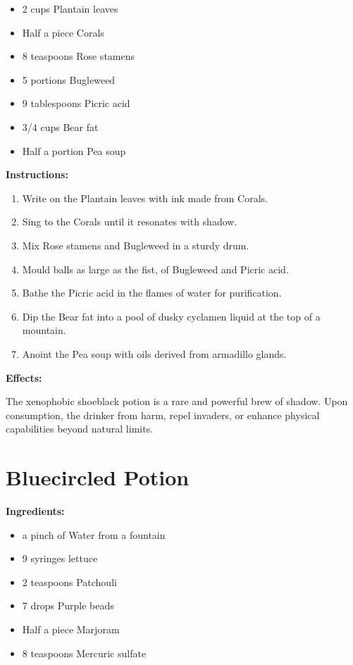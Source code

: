 \documentclass{article}
\begin{document}
\begin{itemize}
  \item 2 cups Plantain leaves
  \item Half a piece Corals
  \item 8 teaspoons Rose stamens
  \item 5 portions Bugleweed
  \item 9 tablespoons Picric acid
  \item 3/4 cups Bear fat
  \item Half a portion Pea soup
\end{itemize}

\textbf{Instructions:}

\begin{enumerate}
  \item Write on the Plantain leaves with ink made from Corals.
  \item Sing to the Corals until it resonates with shadow.
  \item Mix Rose stamens and Bugleweed in a sturdy drum.
  \item Mould balls as large as the fist, of Bugleweed and Picric acid.
  \item Bathe the Picric acid in the flames of water for purification.
  \item Dip the Bear fat into a pool of dusky cyclamen liquid at the top of a mountain.
  \item Anoint the Pea soup with oils derived from armadillo glands.
\end{enumerate}

\textbf{Effects:}

The xenophobic shoeblack potion is a rare and powerful brew of shadow. Upon consumption, the drinker from harm, repel invaders, or enhance physical capabilities beyond natural limits.

\newpage
\section*{Bluecircled Potion}

\textbf{Ingredients:}

\begin{itemize}
  \item a pinch of Water from a fountain
  \item 9 syringes lettuce
  \item 2 teaspoons Patchouli
  \item 7 drops Purple beads
  \item Half a piece Marjoram
  \item 8 teaspoons Mercuric sulfate
\end{itemize}
\end{document}
